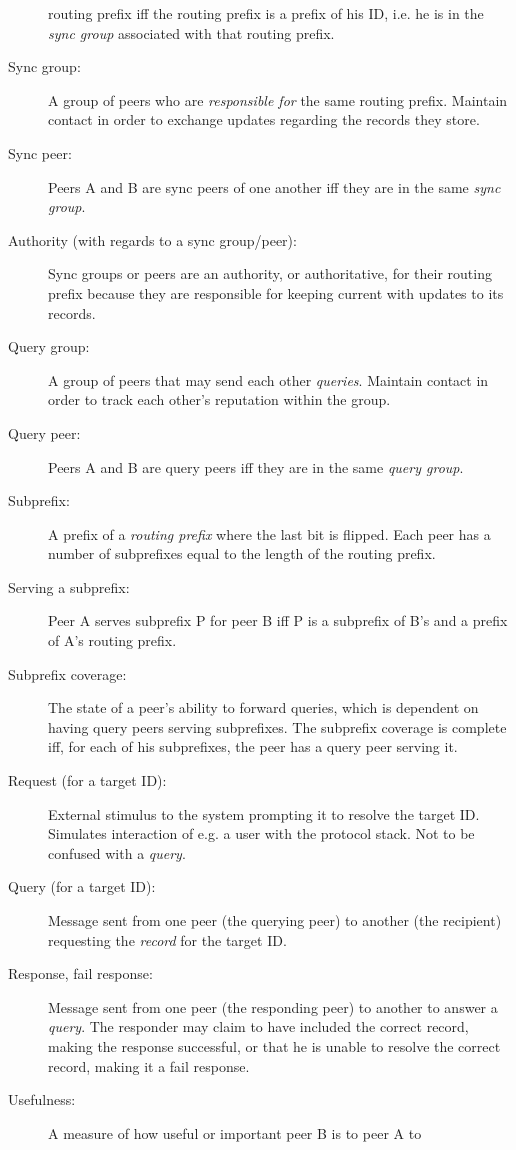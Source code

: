 \begin{description}
routing prefix iff the routing prefix is a prefix of his ID, i.e. he is in the
\emph{sync group} associated with that routing prefix.
\item[Sync group:] A group of peers who are \emph{responsible for} the same
routing prefix. Maintain contact in order to exchange updates regarding the
records they store.
\item[Sync peer:] Peers A and B are sync peers of one another iff they are in
the same \emph{sync group}.
\item[Authority (with regards to a sync group/peer):] Sync groups or peers are
an authority, or authoritative, for their routing prefix because they are
responsible for keeping current with updates to its records.
\item[Query group:] A group of peers that may send each other \emph{queries}.
Maintain contact in order to track each other's reputation within the group.
\item[Query peer:] Peers A and B are query peers iff they are in the same
\emph{query group}.
\item[Subprefix:] A prefix of a \emph{routing prefix} where
the last bit is flipped. Each peer has a number of subprefixes equal to the
length of the routing prefix.
\item[Serving a subprefix:] Peer A serves subprefix P for peer B iff P is a
subprefix of B's and a prefix of A's routing prefix.
\item[Subprefix coverage:] The state of a peer's ability to forward queries,
which is dependent on having query peers serving subprefixes. The subprefix
coverage is complete iff, for each of his subprefixes, the peer has a query peer
serving it.
\item[Request (for a target ID):] External stimulus to the system prompting it
to resolve the target ID. Simulates interaction of e.g. a user with the protocol
stack. Not to be confused with a \emph{query}.
\item[Query (for a target ID):] Message sent from one peer (the querying peer)
to another (the recipient) requesting the \emph{record} for the target ID.
\item[Response, fail response:] Message sent from one peer (the responding peer)
to another to answer a \emph{query}. The responder may claim to have included
the correct record, making the response successful, or that he is unable to
resolve the correct record, making it a fail response.
\item[Usefulness:] A measure of how useful or important peer B is to peer A to

\end{description}

